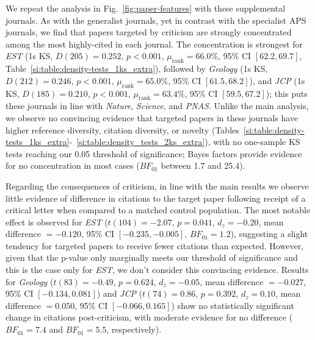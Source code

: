 \documentclass[12pt]{article} %
\begin{document}
We repeat the analysis in Fig.~\ref{fig:paper-features} with these supplemental journals. 
As with the generalist journals, yet in contrast with the specialist APS journals, we find that papers targeted by criticism are strongly concentrated among the most highly-cited in each journal.
The concentration is strongest for \textit{EST} (1s KS, $D(205) = 0.252$, $p < 0.001$, $\mu_{\text{rank}} = 66.0\%$, 95\% CI $[62.2, 69.7]$, Table~\ref*{si:table:density-tests_1ks_extra}), followed by \textit{Geology} (1s KS, $D(212) = 0.246$, $p < 0.001$, $\mu_{\text{rank}} = 65.0\%$, 95\% CI $[61.5, 68.2]$), and \textit{JCP} (1s KS, $D(185) = 0.210$, $p < 0.001$, $\mu_{\text{rank}} = 63.4\%$, 95\% CI $[59.5, 67.2]$);
this puts these journals in line with \textit{Nature}, \textit{Science}, and \textit{PNAS}. 
Unlike the main analysis, we observe no convincing evidence that targeted papers in these journals have higher reference diversity, citation diversity, or novelty (Tables~\ref*{si:table:density-tests_1ks_extra}-~\ref*{si:table:density_tests_2ks_extra}), with no one-sample KS tests reaching our 0.05 threshold of significance; Bayes factors provide evidence for no concentration in most cases ($BF_{01}$ between 1.7 and 25.4). 

Regarding the consequences of criticism, in line with the main results we observe little evidence of difference in citations to the target paper following receipt of a critical letter when compared to a matched control population.
The most notable effect is observed for \textit{EST} ($t(104) = -2.07$, $p = 0.041$, $d_z = -0.20$, mean difference $= -0.120$, 95\% CI $[-0.235, -0.005]$, $BF_{01} = 1.2$), suggesting a slight tendency for targeted papers to receive fewer citations than expected.
However, given that the p-value only marginally meets our threshold of significance and this is the case only for \textit{EST}, we don't consider this convincing evidence. 
Results for \textit{Geology} ($t(83) = -0.49$, $p = 0.624$, $d_z = -0.05$, mean difference $= -0.027$, 95\% CI $[-0.134, 0.081]$) and \textit{JCP} ($t(74) = 0.86$, $p = 0.392$, $d_z = 0.10$, mean difference $= 0.050$, 95\% CI $[-0.066, 0.165]$) show no statistically significant change in citations post-criticism, with moderate evidence for no difference ($BF_{01} = 7.4$ and $BF_{01} = 5.5$, respectively).
\end{document}
